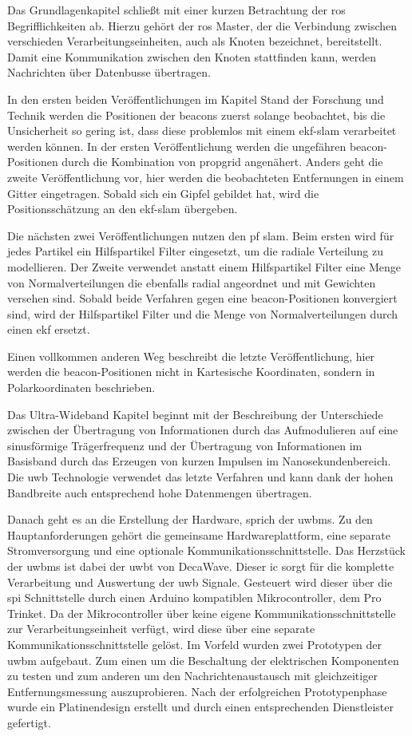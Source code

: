Das Grundlagenkapitel schließt mit einer kurzen Betrachtung der \gls{ros} Begrifflichkeiten ab. Hierzu gehört der \gls{ros} Master, der die Verbindung zwischen verschieden Verarbeitungseinheiten, auch als Knoten bezeichnet, bereitstellt. Damit eine Kommunikation zwischen den Knoten stattfinden kann, werden Nachrichten über Datenbusse übertragen.

In den ersten beiden Veröffentlichungen im Kapitel Stand der Forschung und Technik werden die Positionen der \glspl{beacon} zuerst solange beobachtet, bis die Unsicherheit so gering ist, dass diese problemlos mit einem \gls{ekf}-\gls{slam} verarbeitet werden können. In der ersten Veröffentlichung werden die ungefähren \gls{beacon}-Positionen durch die Kombination von \gls{propgrid} angenähert. Anders geht die zweite Veröffentlichung vor, hier werden die beobachteten Entfernungen in einem Gitter eingetragen. Sobald sich ein Gipfel gebildet hat, wird die Positionsschätzung an den \gls{ekf}-\gls{slam} übergeben.

Die nächsten zwei Veröffentlichungen nutzen den \gls{pf} \gls{slam}. Beim ersten wird für jedes Partikel ein Hilfspartikel Filter eingesetzt, um die radiale Verteilung zu modellieren. Der Zweite verwendet anstatt einem Hilfspartikel Filter eine Menge von Normalverteilungen die ebenfalls radial angeordnet und mit Gewichten versehen sind. Sobald beide Verfahren gegen eine \gls{beacon}-Positionen konvergiert sind, wird der Hilfspartikel Filter und die Menge von Normalverteilungen durch einen \gls{ekf} ersetzt.

Einen vollkommen anderen Weg beschreibt die letzte Veröffentlichung, hier werden die \gls{beacon}-Positionen nicht in Kartesische Koordinaten, sondern in Polarkoordinaten beschrieben.

Das Ultra-Wideband Kapitel beginnt mit der Beschreibung der Unterschiede zwischen der Übertragung von Informationen durch das Aufmodulieren auf eine sinusförmige Trägerfrequenz und der Übertragung von Informationen im Basisband durch das Erzeugen von kurzen Impulsen im Nanosekundenbereich. Die \gls{uwb} Technologie verwendet das letzte Verfahren und kann dank der hohen Bandbreite auch entsprechend hohe Datenmengen übertragen.

Danach geht es an die Erstellung der Hardware, sprich der \glspl{uwbm}. Zu den Hauptanforderungen gehört die gemeinsame Hardwareplattform, eine separate Stromversorgung und eine optionale Kommunikationsschnittstelle. Das Herzstück der \glspl{uwbm} ist dabei der \gls{uwbt} von DecaWave. Dieser \gls{ic} sorgt für die komplette Verarbeitung und Auswertung der \gls{uwb} Signale. Gesteuert wird dieser über die \gls{spi} Schnittstelle durch einen Arduino kompatiblen Mikrocontroller, dem Pro Trinket. Da der Mikrocontroller über keine eigene Kommunikationsschnittstelle zur Verarbeitungseinheit verfügt, wird diese über eine separate Kommunikationsschnittstelle gelöst. Im Vorfeld wurden zwei Prototypen der \gls{uwbm} aufgebaut. Zum einen um die Beschaltung der elektrischen Komponenten zu testen und zum anderen um den Nachrichtenaustausch mit gleichzeitiger Entfernungsmessung auszuprobieren. Nach der erfolgreichen Prototypenphase wurde ein Platinendesign erstellt und durch einen entsprechenden Dienstleister gefertigt.


